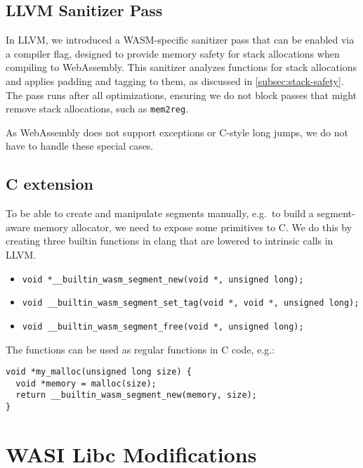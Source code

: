 \subsection{LLVM Sanitizer Pass}
\label{subsec:llvm-sanitizer-pass}

In LLVM, we introduced a WASM-specific sanitizer pass that can be enabled via a compiler flag, designed to provide memory safety for stack allocations when compiling to WebAssembly.
This sanitizer analyzes functions for stack allocations and applies padding and tagging to them, as discussed in \cref{subsec:stack-safety}.
The pass runs after all optimizations, ensuring we do not block passes that might remove stack allocations, such as \texttt{mem2reg}.

As WebAssembly does not support exceptions or C-style long jumps, we do not have to handle these special cases.

\subsection{C extension}
\label{subsec:c-extension}

To be able to create and manipulate segments manually, e.g.\ to build a segment-aware memory allocator, we need to expose some primitives to C.
We do this by creating three builtin functions in clang that are lowered to intrinsic calls in LLVM.

\begin{itemize}
  \item \lstinline[style=customc]{void *__builtin_wasm_segment_new(void *, unsigned long);}
  \item \lstinline[style=customc]{void __builtin_wasm_segment_set_tag(void *, void *, unsigned long);}
  \item \lstinline[style=customc]{void __builtin_wasm_segment_free(void *, unsigned long);}
\end{itemize}

The functions can be used as regular functions in C code, e.g.:

\begin{lstlisting}[frame=h,style=customc,
  label={lst:builtin-functions}]
void *my_malloc(unsigned long size) {
  void *memory = malloc(size);
  return __builtin_wasm_segment_new(memory, size);
}
\end{lstlisting}

\section{WASI Libc Modifications}
\label{sec:wasi-libc}

